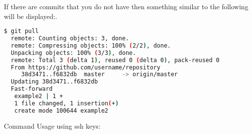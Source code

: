 \documentclass[12pt]{article}
\begin{document}
If there are commits that you do not have then something similar to the following will be displayed:.
\begin{lstlisting}[frame=single,language=bash]
  $ git pull
  remote: Counting objects: 3, done.
  remote: Compressing objects: 100% (2/2), done.
  Unpacking objects: 100% (3/3), done.
  remote: Total 3 (delta 1), reused 0 (delta 0), pack-reused 0
  From https://github.com/username/repository
     38d3471..f6832db  master     -> origin/master
  Updating 38d3471..f6832db
  Fast-forward
   example2 | 1 +
   1 file changed, 1 insertion(+)
   create mode 100644 example2
\end{lstlisting}
Command Usage using ssh keys:
\end{document}
